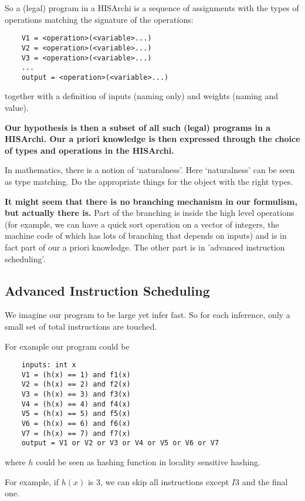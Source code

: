 \documentclass[10pt, oneside]{article}   	%
\theoremstyle{definition}
\begin{document}
So a (legal) program in a HISArchi is a sequence of assignments with the types of operations matching the signature of the operations:
\begin{center}
\begin{verbatim}
	V1 = <operation>(<variable>...)
	V2 = <operation>(<variable>...)
	V3 = <operation>(<variable>...)
	...
	output = <operation>(<variable>...)
\end{verbatim}
\end{center}
together with a definition of inputs (naming only) and weights (naming and value).

\textbf{Our hypothesis is then a subset of all such (legal) programs in a HISArchi. Our a priori knowledge is then expressed through the choice of types and operations in the HISArchi.}

\begin{rmk}
	In mathematics, there is a notion of `naturalness'. Here `naturalness' can be seen as type matching. Do the appropriate things for the object with the right types.
\end{rmk}

\textbf{It might seem that there is no branching mechanism in our formulism, but actually there is.} Part of the branching is inside the high level operations (for example, we can have a quick sort operation on a vector of integers, the machine code of which has lots of branching that depends on inputs) and is in fact part of our a priori knowledge. The other part is in 'advanced instruction scheduling'.

\subsection{Advanced Instruction Scheduling}

We imagine our program to be large yet infer fast. So for each inference, only a small set of total instructions are touched.

For example our program could be
\begin{verbatim}
	inputs: int x
	V1 = (h(x) == 1) and f1(x)
	V2 = (h(x) == 2) and f2(x)
	V3 = (h(x) == 3) and f3(x)
	V4 = (h(x) == 4) and f4(x)
	V5 = (h(x) == 5) and f5(x)
	V6 = (h(x) == 6) and f6(x)
	V7 = (h(x) == 7) and f7(x)
	output = V1 or V2 or V3 or V4 or V5 or V6 or V7
\end{verbatim}

where $h$ could be seen as hashing function in locality sensitive hashing.

For example, if $h(x)$ is 3, we can skip all instructions except $I3$ and the final one.
\end{document}
